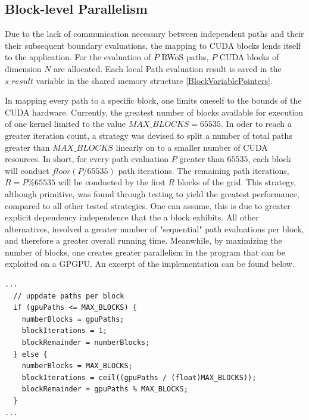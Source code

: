 \subsection{Block-level Parallelism}
Due to the lack of communication necessary between independent paths and their
their subsequent boundary evaluations, the mapping to \Gls{CUDA} blocks lends itself
to the  application.  For the evaluation of $P$ \Gls{RWoS} paths, $P$ CUDA blocks
of dimension $N$ are allocated.  Each local Path evaluation result is saved in the $s\_result$
variable in the shared memory structure \ref{BlockVariablePointers}.
\par
In mapping every path to a specific block, one limits oneself to the bounds of the
CUDA hardware.  Currently, the greatest number of blocks available for execution
of one kernel limited to the value $MAX\_BLOCKS = 65535$.  In oder to reach a greater
iteration count, a strategy was devised to split a number of total paths greater
than $MAX\_BLOCKS$ linearly on to a smaller number of \Gls{CUDA} resources.  In short,
for every path evaluation $P$ greater than $65535$, each block will conduct $floor(P/65535)$
path iterations. The remaining path iterations, $R = P \% 65535$ will be conducted
 by the first $R$ blocks of the grid.  This strategy,
although primitive, was found through testing to yield the greatest performance,
compared to all other tested strategies. One can assume, this is due to greater
explicit dependency independence that the a block exhibits.  All other alternatives,
involved a greater number of "sequential" path evaluations per block, and therefore
a greater overall running time.   Meanwhile, by maximizing the number of blocks,
one creates greater parallelism in the program that can be exploited on a \Gls{GPGPU}.
An excerpt of the implementation can be found below.

\begin{lstlisting}[caption="src/gpu\_config.cpp Appendix \ref{appendix}",label=block-parallelism-strategy]
  ...
  // uppdate paths per block
  if (gpuPaths <= MAX_BLOCKS) {
    numberBlocks = gpuPaths;
    blockIterations = 1;
    blockRemainder = numberBlocks;
  } else {
    numberBlocks = MAX_BLOCKS;
    blockIterations = ceil((gpuPaths / (float)MAX_BLOCKS));
    blockRemainder = gpuPaths % MAX_BLOCKS;
  }
...
\end{lstlisting}


